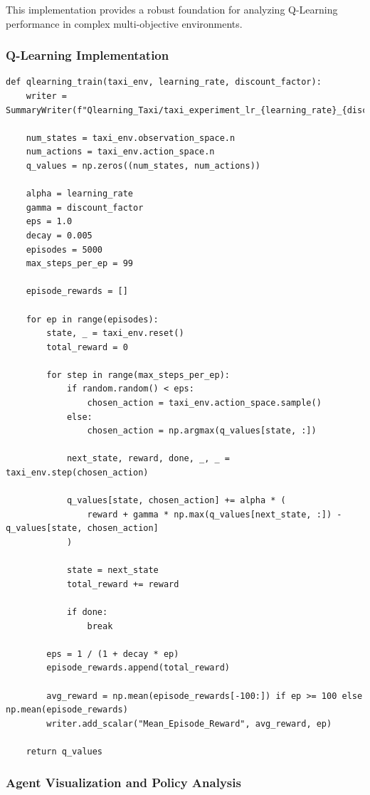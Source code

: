 \documentclass[12pt]{article}
\begin{document}
{{{This implementation provides a robust foundation for analyzing Q-Learning performance in complex multi-objective environments.

\subsubsection{Q-Learning Implementation}

\begin{verbatim}
def qlearning_train(taxi_env, learning_rate, discount_factor):
    writer = SummaryWriter(f"Qlearning_Taxi/taxi_experiment_lr_{learning_rate}_{discount_factor}")
    
    num_states = taxi_env.observation_space.n
    num_actions = taxi_env.action_space.n
    q_values = np.zeros((num_states, num_actions))
    
    alpha = learning_rate
    gamma = discount_factor
    eps = 1.0
    decay = 0.005
    episodes = 5000
    max_steps_per_ep = 99
    
    episode_rewards = []
    
    for ep in range(episodes):
        state, _ = taxi_env.reset()
        total_reward = 0
    
        for step in range(max_steps_per_ep):
            if random.random() < eps:
                chosen_action = taxi_env.action_space.sample()
            else:
                chosen_action = np.argmax(q_values[state, :])
            
            next_state, reward, done, _, _ = taxi_env.step(chosen_action)
            
            q_values[state, chosen_action] += alpha * (
                reward + gamma * np.max(q_values[next_state, :]) - q_values[state, chosen_action]
            )
    
            state = next_state
            total_reward += reward
    
            if done:
                break
    
        eps = 1 / (1 + decay * ep)
        episode_rewards.append(total_reward)
        
        avg_reward = np.mean(episode_rewards[-100:]) if ep >= 100 else np.mean(episode_rewards)
        writer.add_scalar("Mean_Episode_Reward", avg_reward, ep)
    
    return q_values
\end{verbatim}

\subsubsection{Agent Visualization and Policy Analysis}

}}}
\end{document}
